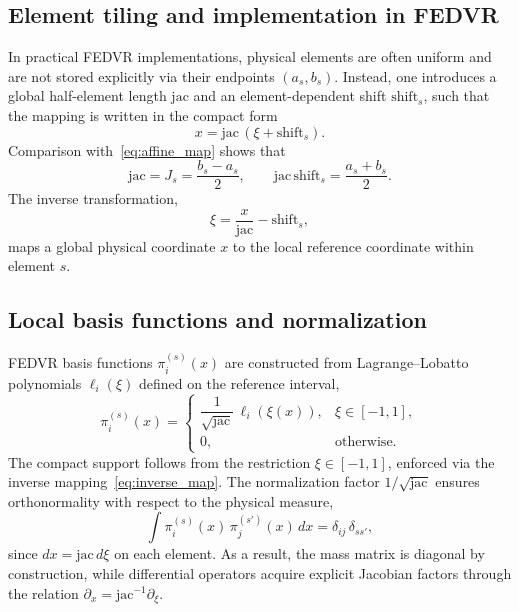 \subsection{Element tiling and implementation in FEDVR}

In practical FEDVR implementations, physical elements are often uniform and are not stored explicitly via their endpoints $(a_s,b_s)$. Instead, one introduces a global half-element length $\text{jac}$ and an element-dependent shift $\text{shift}_s$, such that the mapping is written in the compact form
\begin{equation}
\label{eq:fedvr_map}
x = \text{jac}\,(\xi + \text{shift}_s).
\end{equation}
Comparison with~\eqref{eq:affine_map} shows that
\begin{equation}
\text{jac} = J_s = \frac{b_s-a_s}{2},
\qquad
\text{jac}\,\text{shift}_s = \frac{a_s+b_s}{2}.
\end{equation}
The inverse transformation,
\begin{equation}
\label{eq:inverse_map}
\xi = \frac{x}{\text{jac}} - \text{shift}_s,
\end{equation}
maps a global physical coordinate $x$ to the local reference coordinate within element $s$.

\subsection{Local basis functions and normalization}

FEDVR basis functions $\pi_i^{(s)}(x)$ are constructed from Lagrange--Lobatto polynomials $\ell_i(\xi)$ defined on the reference interval,
\begin{equation}
\pi_i^{(s)}(x) =
\begin{cases}
\dfrac{1}{\sqrt{\text{jac}}}\,\ell_i(\xi(x)), & \xi \in [-1,1], \\
0, & \text{otherwise}.
\end{cases}
\end{equation}
The compact support follows from the restriction $\xi\in[-1,1]$, enforced via the inverse mapping~\eqref{eq:inverse_map}. The normalization factor $1/\sqrt{\text{jac}}$ ensures orthonormality with respect to the physical measure,
\begin{equation}
\int \pi_i^{(s)}(x)\,\pi_j^{(s')}(x)\,dx = \delta_{ij}\,\delta_{ss'},
\end{equation}
since $dx=\text{jac}\,d\xi$ on each element. As a result, the mass matrix is diagonal by construction, while differential operators acquire explicit Jacobian factors through the relation $\partial_x = \text{jac}^{-1}\partial_\xi$.


